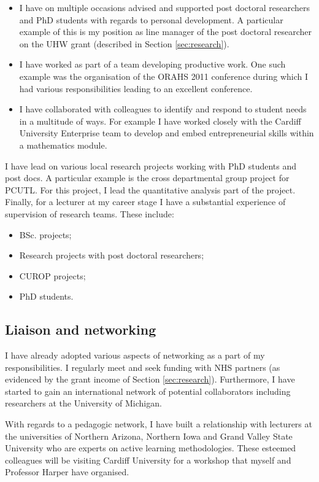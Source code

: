 \documentclass{article}
\begin{document}
\begin{itemize}
    \item I have on multiple occasions advised and supported post doctoral researchers and PhD students with regards to personal development.
    A particular example of this is my position as line manager of the post doctoral researcher on the UHW grant (described in Section \ref{sec:research}).
    \item I have worked as part of a team developing productive work. One such example was the organisation of the ORAHS 2011 conference during which I had various responsibilities leading to an excellent conference.
    \item I have collaborated with colleagues to identify and respond to student needs in a multitude of ways.
    For example I have worked closely with the Cardiff University Enterprise team to develop and embed entrepreneurial skills within a mathematics module.
\end{itemize}

I have lead on various local research projects working with PhD students and post docs.
A particular example is the cross departmental group project for PCUTL.
For this project, I lead the quantitative analysis part of the project.
Finally, for a lecturer at my career stage I have a substantial experience of supervision of research teams.
These include:

\begin{itemize}
    \item BSc. projects;
    \item Research projects with post doctoral researchers;
    \item CUROP projects;
    \item PhD students.
\end{itemize}

\subsection{Liaison and networking}

I have already adopted various aspects of networking as a part of my responsibilities.
I regularly meet and seek funding with NHS partners (as evidenced by the grant income of Section \ref{sec:research}).
Furthermore, I have started to gain an international network of potential collaborators including researchers at the University of Michigan.

With regards to a pedagogic network, I have built a relationship with lecturers at the universities of Northern Arizona, Northern Iowa and Grand Valley State University who are experts on active learning methodologies.
These esteemed colleagues will be visiting Cardiff University for a workshop that myself and Professor Harper have organised.
\end{document}
